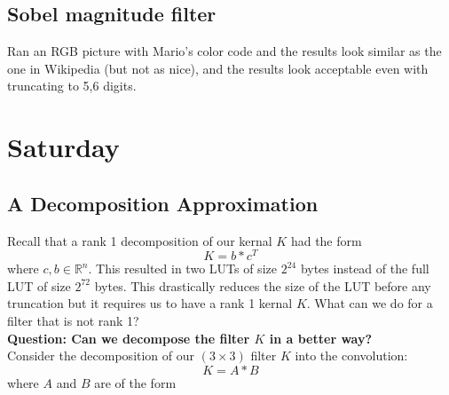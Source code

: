 \documentclass[12pt]{amsart}
\theoremstyle{definition}
\theoremstyle{remark}
\numberwithin{thm}{section}
\begin{document}
\subsection{Sobel magnitude filter}
Ran an RGB picture with Mario's color code and the results look similar as the one in Wikipedia (but not as nice), and the results look acceptable even with truncating to 5,6 digits.

\section{Saturday}






\subsection{A Decomposition Approximation}
Recall that a rank 1 decomposition of our kernal $K$ had the form $$
K=b*c^T
$$
where $c,b \in \mathbb{R}^n$. This resulted in two LUTs of size $2^{24}$ bytes instead of the full LUT of size $2^{72}$ bytes. This drastically reduces the size of the LUT before any truncation but it requires us to have a rank 1 kernal $K$. What can we do for a filter that is not rank 1?
\\
\textbf{Question: Can we decompose the filter $K$ in a better way?}
\\
Consider the decomposition of our $(3\times 3)$ filter $K$ into the convolution:
$$K=A*B$$
where $A$ and $B$ are of the form
\end{document}
